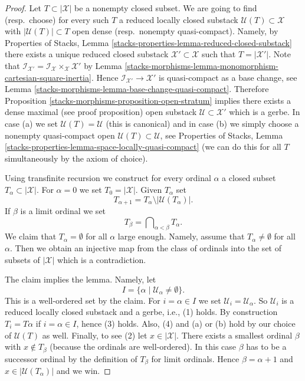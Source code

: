 \begin{proof}
Let $T \subset |\mathcal{X}|$ be a nonempty closed subset. We are going
to find (resp.\ choose) for every such $T$ a reduced locally closed substack
$\mathcal{U}(T) \subset \mathcal{X}$ with $|\mathcal{U}(T)| \subset T$
open dense (resp.\ nonempty quasi-compact). Namely, by
Properties of Stacks, Lemma
\ref{stacks-properties-lemma-reduced-closed-substack}
there exists a unique reduced closed substack
$\mathcal{X}' \subset \mathcal{X}$ such that $T = |\mathcal{X}'|$.
Note that $\mathcal{I}_{\mathcal{X}'} =
\mathcal{I}_\mathcal{X} \times_\mathcal{X} \mathcal{X}'$ by
Lemma \ref{stacks-morphisms-lemma-monomorphism-cartesian-square-inertia}.
Hence $\mathcal{I}_{\mathcal{X}'} \to \mathcal{X}'$ is
quasi-compact as a base change, see
Lemma \ref{stacks-morphisms-lemma-base-change-quasi-compact}.
Therefore
Proposition \ref{stacks-morphisms-proposition-open-stratum}
implies there exists a dense maximal (see proof proposition)
open substack $\mathcal{U} \subset \mathcal{X}'$
which is a gerbe. In case (a) we set $\mathcal{U}(T) = \mathcal{U}$
(this is canonical) and in case (b) we simply choose a nonempty quasi-compact
open $\mathcal{U}(T) \subset \mathcal{U}$, see
Properties of Stacks, Lemma
\ref{stacks-properties-lemma-space-locally-quasi-compact}
(we can do this for all $T$
simultaneously by the axiom of choice).

\medskip\noindent
Using transfinite recursion we construct for every ordinal $\alpha$ a
closed subset $T_\alpha \subset |\mathcal{X}|$. For $\alpha = 0$
we set $T_0 = |\mathcal{X}|$. Given $T_\alpha$ set
$$
T_{\alpha + 1} = T_\alpha \setminus |\mathcal{U}(T_\alpha)|.
$$
If $\beta$ is a limit ordinal we set
$$
T_\beta = \bigcap\nolimits_{\alpha < \beta} T_\alpha.
$$
We claim that $T_\alpha = \emptyset$ for all $\alpha$
large enough. Namely, assume that $T_\alpha \not = \emptyset$
for all $\alpha$. Then we obtain an injective map from the class
of ordinals into the set of subsets of $|\mathcal{X}|$ which is a
contradiction.

\medskip\noindent
The claim implies the lemma. Namely, let
$$
I = \{\alpha \mid \mathcal{U}_\alpha \not = \emptyset \}.
$$
This is a well-ordered set by the claim. For $i = \alpha \in I$ we set
$\mathcal{U}_i = \mathcal{U}_\alpha$. So $\mathcal{U}_i$ is a reduced
locally closed substack and a gerbe, i.e., (1) holds. By construction
$T_i = T\alpha$ if $i = \alpha \in I$, hence (3) holds. Also, (4) and
(a) or (b) hold by our choice of $\mathcal{U}(T)$ as well. Finally, to see
(2) let $x \in |\mathcal{X}|$. There exists a smallest ordinal $\beta$
with $x \not \in T_\beta$ (because the ordinals are well-ordered).
In this case $\beta$ has to be a successor ordinal by the definition
of $T_\beta$ for limit ordinals. Hence $\beta = \alpha + 1$ and
$x \in |\mathcal{U}(T_\alpha)|$ and we win.
\end{proof}

